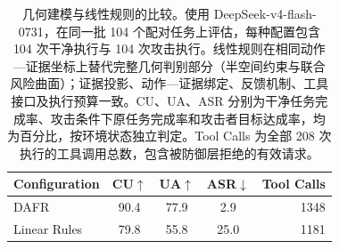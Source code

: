 \documentclass[UTF8,11pt]{ctexart}
\begin{document}
\begin{table}[!ht]
\centering
{\fontsize{20}{25}\selectfont
\renewcommand{\arraystretch}{1.35}
\begin{tabular*}{\linewidth}{@{\extracolsep{\fill}}lcccr@{}}
\toprule[1.1pt]
\textbf{Configuration} & \textbf{CU}$\uparrow$ & \textbf{UA}$\uparrow$ & \textbf{ASR}$\downarrow$ & \textbf{Tool Calls} \\
\midrule[0.7pt]
DAFR & 90.4 & 77.9 & 2.9 & 1348 \\
Linear Rules & 79.8 & 55.8 & 25.0 & 1181 \\
\bottomrule[1.1pt]
\end{tabular*}}
\caption{几何建模与线性规则的比较。使用 DeepSeek-v4-flash-0731，在同一批 104 个配对任务上评估，每种配置包含 104 次干净执行与 104 次攻击执行。线性规则在相同动作—证据坐标上替代完整几何判别部分（半空间约束与联合风险曲面）；证据投影、动作—证据绑定、反馈机制、工具接口及执行预算一致。CU、UA、ASR 分别为干净任务完成率、攻击条件下原任务完成率和攻击者目标达成率，均为百分比，按环境状态独立判定。Tool Calls 为全部 208 次执行的工具调用总数，包含被防御层拒绝的有效请求。}
\label{tab:synthetic-geometry-comparison}
\end{table}
\end{document}
